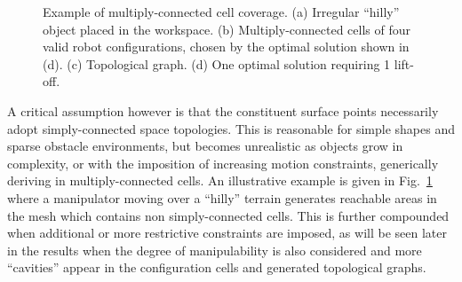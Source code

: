 \documentclass[journal]{IEEEtran}
\begin{document}
\begin{figure}[t]
\centering
{}
\caption{Example of multiply-connected cell coverage. (a) Irregular ``hilly'' object placed in the workspace. 
(b) Multiply-connected cells of four valid robot configurations, chosen by the optimal solution shown in (d). 
(c) Topological graph. (d) One optimal solution requiring 1 lift-off.}
\label{fig:hill_multiply_conn}
\end{figure}

A critical assumption however is that the constituent surface points necessarily adopt simply-connected space topologies. 
This is reasonable for simple shapes and sparse obstacle environments, but becomes unrealistic as objects grow in complexity, 
or with the imposition of increasing motion constraints, generically deriving in multiply-connected cells. An illustrative example is 
given in Fig.~\ref{fig:hill_multiply_conn} where a manipulator moving over a ``hilly'' terrain generates reachable areas in the
 mesh which contains non simply-connected cells. This is further compounded when additional or more restrictive constraints are imposed, 
 as will be seen later in the results when the degree of manipulability is also considered and more ``cavities'' appear in the configuration 
 cells and generated topological graphs.
\end{document}
